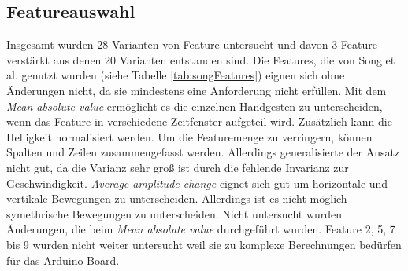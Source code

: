 \subsection{Featureauswahl}
Insgesamt wurden 28 Varianten von Feature untersucht und davon 3 Feature verstärkt aus denen 20 Varianten entstanden sind. Die Features, die von Song et al. genutzt wurden
(siehe Tabelle \ref{tab:songFeatures}) eignen sich ohne Änderungen nicht, da sie mindestens eine Anforderung nicht erfüllen.
\newline
\newline
Mit dem \textit{Mean absolute value} ermöglicht es die einzelnen Handgesten zu unterscheiden, wenn das Feature in verschiedene Zeitfenster aufgeteil wird. Zusätzlich kann die Helligkeit normalisiert werden.
Um die Featuremenge zu verringern, können Spalten und Zeilen zusammengefasst werden. Allerdings generalisierte der Ansatz nicht gut, da die Varianz sehr groß ist durch die fehlende Invarianz zur Geschwindigkeit.
\newline
\newline
\textit{Average amplitude change} eignet sich gut um horizontale und vertikale Bewegungen zu unterscheiden. Allerdings ist es nicht möglich symethrische Bewegungen zu unterscheiden. Nicht untersucht wurden
Änderungen, die beim \textit{Mean absolute value} durchgeführt wurden.
\newline
\newline
Feature 2, 5, 7 bis 9 wurden nicht weiter untersucht weil sie zu komplexe Berechnungen bedürfen für das Arduino Board.

